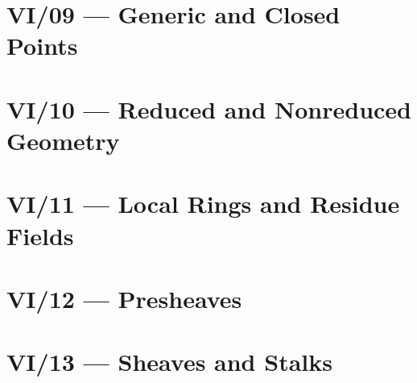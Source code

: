 





\section{VI/09 --- Generic and Closed Points}




\section{VI/10 --- Reduced and Nonreduced Geometry}




\section{VI/11 --- Local Rings and Residue Fields}




\section{VI/12 --- Presheaves}




\section{VI/13 --- Sheaves and Stalks}

